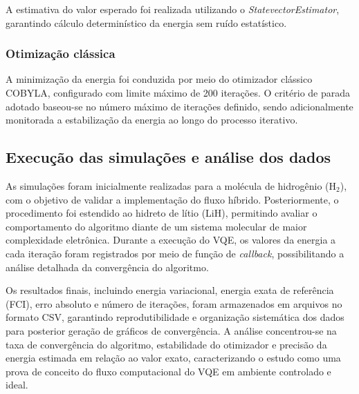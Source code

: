 A estimativa do valor esperado foi realizada utilizando o 
\textit{StatevectorEstimator}, garantindo cálculo determinístico da energia 
sem ruído estatístico.

\subsubsection{Otimização clássica}

A minimização da energia foi conduzida por meio do otimizador clássico 
COBYLA, configurado com limite máximo de 200 iterações. O critério de parada 
adotado baseou-se no número máximo de iterações definido, sendo 
adicionalmente monitorada a estabilização da energia ao longo do processo 
iterativo.

\subsection{Execução das simulações e análise dos dados}

As simulações foram inicialmente realizadas para a molécula de hidrogênio 
(H$_2$), com o objetivo de validar a implementação do fluxo híbrido. 
Posteriormente, o procedimento foi estendido ao hidreto de lítio (LiH), 
permitindo avaliar o comportamento do algoritmo diante de um sistema 
molecular de maior complexidade eletrônica.
Durante a execução do VQE, os valores da energia a cada iteração foram 
registrados por meio de função de \textit{callback}, possibilitando a 
análise detalhada da convergência do algoritmo.

Os resultados finais, incluindo energia variacional, energia exata de 
referência (FCI), erro absoluto e número de iterações, foram armazenados em 
arquivos no formato CSV, garantindo reprodutibilidade e organização 
sistemática dos dados para posterior geração de gráficos de convergência.
A análise concentrou-se na taxa de convergência do algoritmo, estabilidade 
do otimizador e precisão da energia estimada em relação ao valor exato, 
caracterizando o estudo como uma prova de conceito do fluxo computacional do 
VQE em ambiente controlado e ideal.